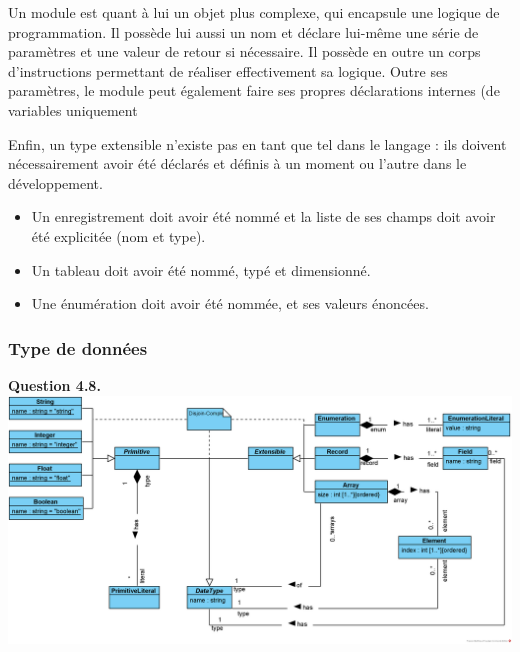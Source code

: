 \documentclass[oneside,a4paper]{book}
\begin{document}
Un module est quant à lui un objet plus complexe, qui encapsule une logique de programmation. Il possède lui aussi un nom et déclare lui-même une série de paramètres et une valeur de retour si nécessaire. Il possède en outre un corps d'instructions permettant de réaliser effectivement sa logique.  Outre ses paramètres, le module peut également faire ses propres déclarations internes (de variables uniquement\newline

Enfin, un type extensible n'existe pas en tant que tel dans le langage : ils doivent nécessairement avoir été déclarés et définis à un moment ou l'autre dans le développement.
\begin{itemize}
    \item Un enregistrement doit avoir été nommé et la liste de ses champs doit avoir été explicitée (nom et type).
    \item Un tableau doit avoir été nommé, typé et dimensionné.
    \item Une énumération doit avoir été nommée, et ses valeurs énoncées.
\end{itemize}

\subsubsection{Type de données}

\textbf{Question 4.8.}\label{Question 4.8.}\newline
\nopagebreak 
\includegraphics[width=\textwidth,height=\textheight,keepaspectratio]{Diagrams/DS-DataType.png}\newline
\end{document}

